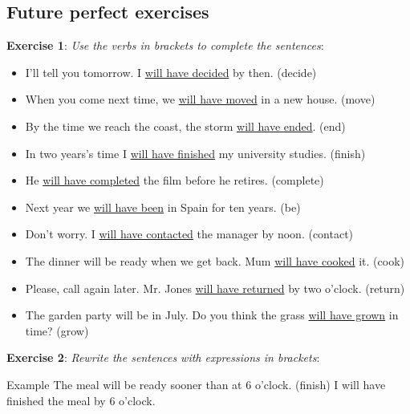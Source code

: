 \subsection{Future perfect exercises}

\textbf{Exercise 1}: \textit{Use the verbs in brackets to complete the sentences}:

\begin{itemize}

\item I'll tell you tomorrow. I \underline{will have decided} by then. (decide)
\item When you come next time, we \underline{will have moved} in a new house. (move) 
\item By the time we reach the coast, the storm \underline{will have ended}. (end)
\item In two years's time I \underline{will have finished} my university studies. (finish)
\item He \underline{will have completed} the film before he retires. (complete) 
\item Next year we \underline{will have been} in Spain for ten years. (be)
\item Don't worry. I \underline{will have contacted} the manager by noon. (contact)
\item The dinner will be ready when we get back. Mum \underline{will have cooked} it. (cook) 
\item Please, call again later. Mr. Jones \underline{will have returned} by two o'clock. (return) 
\item The garden party will be in July. Do you think the grass \underline{will have grown} in time? (grow) 

\end{itemize}

\textbf{Exercise 2}: \textit{Rewrite the sentences with expressions in brackets}:

Example 
The meal will be ready sooner than at 6 o'clock. (finish) 
I will have finished the meal by 6 o'clock. 

